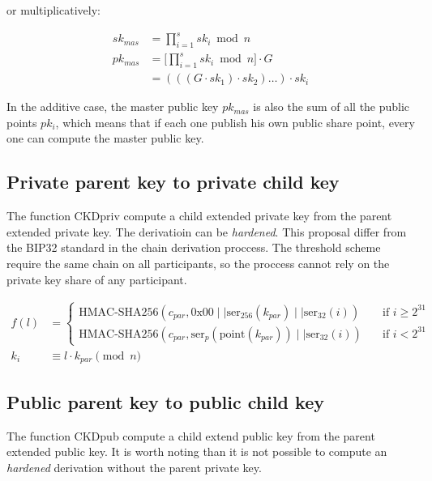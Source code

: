 or multiplicatively:

\begin{equation*}
\begin{split}
  sk_{mas} &= \prod_{i=1}^{s} sk_i \bmod n \\
  pk_{mas} &= \Bigg[ \prod_{i=1}^{s} sk_i \bmod n \Bigg] \cdot G \\
           &= (((G \cdot sk_1) \cdot sk_2) \dots )\cdot sk_i
\end{split}
\end{equation*}

In the additive case, the master public key $pk_{mas}$ is also the sum of all the
public points $pk_i$, which means that if each one publish his own public share
point, every one can compute the master public key.

\subsection{Private parent key to private child key}
The function CKDpriv compute a child extended private key from the parent extended
private key. The derivatioin can be \textit{hardened}. This proposal differ from
the BIP32 standard in the chain derivation proccess. The threshold scheme require
the same chain on all participants, so the proccess cannot rely on the private key
share of any participant.

\begin{equation*}
\begin{split}
  f(l) &=
  \begin{cases}
    \text{HMAC-SHA256}(c_{par}, \text{0x00}\mid\mid \text{ser}_{256}(k_{par})
    \mid\mid \text{ser}_{32}(i)) & \quad \text{if } i \geq 2^{31}\\
    \text{HMAC-SHA256}(c_{par}, \text{ser}_{p}(\text{point}(k_{par}))
    \mid\mid \text{ser}_{32}(i)) & \quad \text{if } i < 2^{31}
  \end{cases} \\
  k_i &\equiv l \cdot k_{par} \pmod n
\end{split}
\end{equation*}

\subsection{Public parent key to public child key}
The function CKDpub compute a child extend public key from the parent extended
public key. It is worth noting than it is not possible to compute an
\textit{hardened} derivation without the parent private key.

